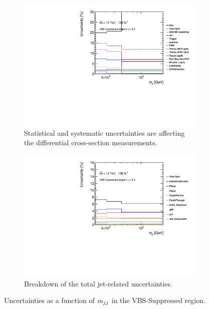 \begin{figure}[!htb]
    \centering
    \begin{subfigure}{.48\textwidth}
        \centering
        \includegraphics[width=.9\linewidth]{figures/Analysis/Systematics/systematics_VBS_Suppressed.pdf}
        \caption{ Statistical and systematic uncertainties are affecting the differential cross-section measurements. \label{fig:sys_mjj_VBS_Suppressed_total}}
    \end{subfigure}
    \begin{subfigure}{.48\textwidth}
        \centering
        \includegraphics[width=.9\linewidth]{figures/Analysis/Systematics/jet_systematics_VBS_Suppressed.pdf}
        \caption{Breakdown of the total jet-related uncertainties. \label{fig:sys_mjj_VBS_Suppressed_jet} }
    \end{subfigure}
    \caption{Uncertainties as a function of $m_{jj}$ in the VBS-Suppressed region.}  \label{fig:sys_mjj_VBS_Suppressed}
\end{figure}

